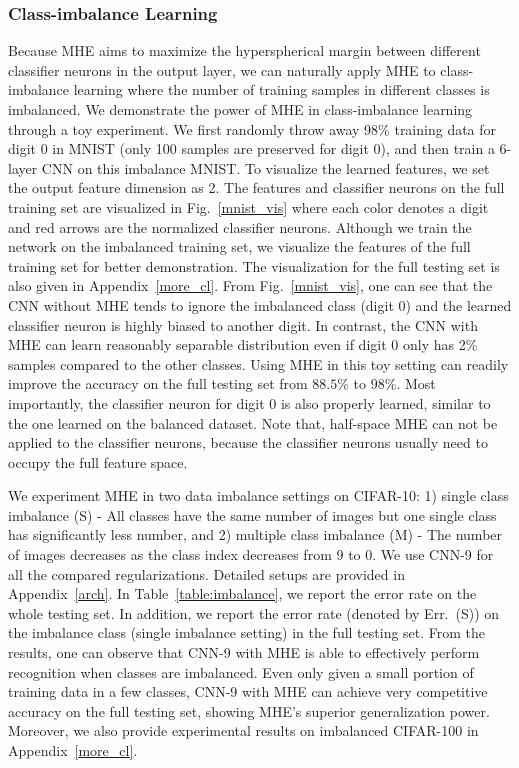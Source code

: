 \subsubsection{Class-imbalance Learning}

Because MHE aims to maximize the hyperspherical margin between different classifier neurons in the output layer, we can naturally apply MHE to class-imbalance learning where the number of training samples in different classes is imbalanced. We demonstrate the power of MHE in class-imbalance learning through a toy experiment. We first randomly throw away 98\% training data for digit 0 in MNIST (only 100 samples are preserved for digit 0), and then train a 6-layer CNN on this imbalance MNIST. To visualize the learned features, we set the output feature dimension as 2. The features and classifier neurons on the full training set are visualized in Fig.~\ref{mnist_vis} where each color denotes a digit and red arrows are the normalized classifier neurons. Although we train the network on the imbalanced training set, we visualize the features of the full training set for better demonstration. The visualization for the full testing set is also given in Appendix~\ref{more_cl}. From Fig.~\ref{mnist_vis}, one can see that the CNN without MHE tends to ignore the imbalanced class (digit 0) and the learned classifier neuron is highly biased to another digit. In contrast, the CNN with MHE can learn reasonably separable distribution even if digit 0 only has 2\% samples compared to the other classes. Using MHE in this toy setting can readily improve the accuracy on the full testing set from $88.5\%$ to $98\%$. Most importantly, the classifier neuron for digit 0 is also properly learned, similar to the one learned on the balanced dataset. Note that, half-space MHE can not be applied to the classifier neurons, because the classifier neurons usually need to occupy the full feature space.

We experiment MHE in two data imbalance settings on CIFAR-10: 1) single class imbalance (S) - All classes have the same number of images but one single class has significantly less number, and 2) multiple class imbalance (M) - The number of images decreases as the class index decreases from 9 to 0. We use CNN-9 for all the compared regularizations. Detailed setups are provided in Appendix~\ref{arch}. In Table~\ref{table:imbalance}, we report the error rate on the whole testing set. In addition, we report the error rate (denoted by Err.~(S)) on the imbalance class (single imbalance setting) in the full testing set. From the results, one can observe that CNN-9 with MHE is able to effectively perform recognition when classes are imbalanced. Even only given a small portion of training data in a few classes, CNN-9 with MHE can achieve very competitive accuracy on the full testing set, showing MHE's superior generalization power. Moreover, we also provide experimental results on imbalanced CIFAR-100 in Appendix~\ref{more_cl}.

